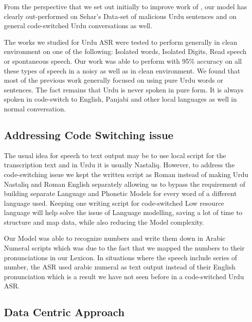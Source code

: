 From the perspective that we set out initially to improve work of \cite{sehar_gul_detecting_2020}, our model has clearly out-performed on Sehar's Data-set of malicious Urdu sentences and on general code-switched Urdu conversations as well. 

The works we studied for Urdu ASR were tested to perform generally in clean environment on one of the following: Isolated words, Isolated Digits, Read speech or spontaneous speech. Our work was able to perform with 95\% accuracy on all these types of speech in a noisy as well as in clean environment. We found that most of the previous work generally focused on using pure Urdu words or sentences. The fact remains that Urdu is never spoken in pure form. It is always spoken in code-switch to English, Panjabi and other local languages as well in normal conversation. 

\subsection{Addressing Code Switching issue}

The usual idea for speech to text output may be to use local script for the transcription text and in Urdu it is usually Nastaliq. However, to address the code-switching issue we kept the written script as Roman instead of making Urdu Nastaliq and Roman English separately allowing us to bypass the requirement of building separate Language and Phonetic Models for every word of a different language used. Keeping one writing script for code-switched Low resource language will help solve the issue of Language modelling, saving a lot of time to structure and map data, while also reducing the Model complexity. 

Our Model was able to recognize numbers and write them down in Arabic Numeral scripts which was due to the fact that we mapped the numbers to their pronunciations in our Lexicon. In situations where the speech include series of number, the ASR used arabic numeral as text output instead of their English pronunciation which is a result we have not seen before in a code-switched Urdu ASR. 

\subsection{Data Centric Approach}

